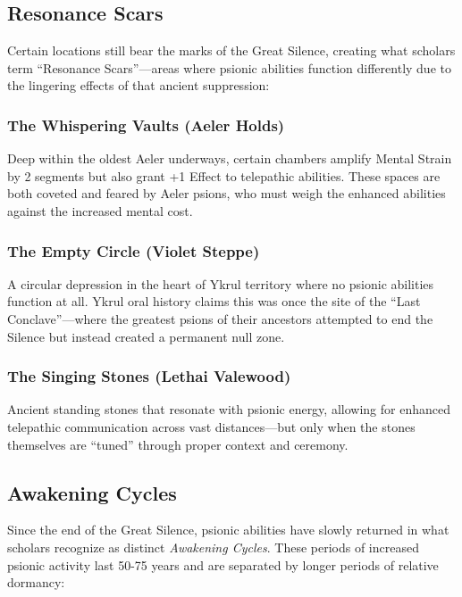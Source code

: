 \documentclass[11pt,twoside]{article}
\begin{document}
\subsection{Resonance Scars}

Certain locations still bear the marks of the Great Silence, creating what scholars term ``Resonance Scars''---areas where psionic abilities function differently due to the lingering effects of that ancient suppression:

\subsubsection{The Whispering Vaults (Aeler Holds)}
Deep within the oldest Aeler underways, certain chambers amplify Mental Strain by 2 segments but also grant +1 Effect to telepathic abilities. These spaces are both coveted and feared by Aeler psions, who must weigh the enhanced abilities against the increased mental cost.

\subsubsection{The Empty Circle (Violet Steppe)}
A circular depression in the heart of Ykrul territory where no psionic abilities function at all. Ykrul oral history claims this was once the site of the ``Last Conclave''---where the greatest psions of their ancestors attempted to end the Silence but instead created a permanent null zone.

\subsubsection{The Singing Stones (Lethai Valewood)}
Ancient standing stones that resonate with psionic energy, allowing for enhanced telepathic communication across vast distances---but only when the stones themselves are ``tuned'' through proper context and ceremony.

\subsection{Awakening Cycles}

Since the end of the Great Silence, psionic abilities have slowly returned in what scholars recognize as distinct \textit{Awakening Cycles}. These periods of increased psionic activity last 50-75 years and are separated by longer periods of relative dormancy:
\end{document}
